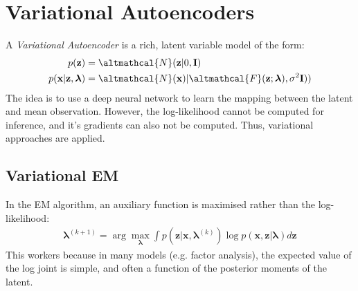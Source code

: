 \documentclass[a4paper]{book}
\newcommand{\vect}[1]{\boldsymbol{\mathbf{#1}}}
\newcommand{\ix}[1]{%
  \leavevmode %
  \marginpar{\small\emph{#1}}%
}
\begin{document}
\section{Variational Autoencoders}
A \emph{Variational Autoencoder}\ix{VAE} is a rich, latent variable model of the form:
\begin{align}
p(\vect{z}) &= \altmathcal{N}(\vect{z}| 0, \vect{I}) \label{eq:vae_1}\\
p(\vect{x}|\vect{z}, \vect{\lambda}) &= \altmathcal{N}(\vect{x})| \altmathcal{F}(\vect{z}; \vect{\lambda}), \sigma^2 \vect{I} )) \label{eq:vae_2}
\end{align}
The idea is to use a deep neural network to learn the mapping between the latent and mean observation. However, the log-likelihood cannot be computed for inference, and it's gradients can also not be computed. Thus, variational approaches are applied. 

\subsection{Variational EM}
In the EM algorithm, an auxiliary function is maximised rather than the log-likelihood:
\begin{align}
\vect{\lambda}^{(k+1)} = \arg \max_{\vect{\lambda}} \int p(\vect{z} | \vect{x}, \vect{\lambda}^{(k)}) \log p(\vect{x}, \vect{z}| \vect{\lambda}) d\vect{z}
\end{align}
This workers because in many models (e.g. factor analysis), the expected value of the log joint is simple, and often a function of the posterior moments of the latent.
\end{document}

